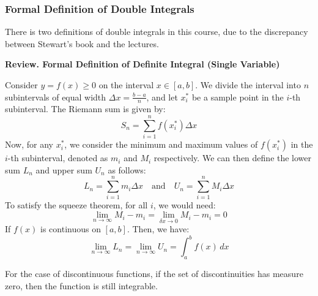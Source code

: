 \documentclass[11pt]{report}
\begin{document}
\subsubsection{Formal Definition of Double Integrals}
There is two definitions of double integrals in this course, due to the discrepancy between Stewart's book and the lectures. 

\begin{shaded}
    \textbf{Review.  Formal Definition of Definite Integral (Single Variable)}

    Consider $y = f(x) \ge 0$ on the interval $x \in [a,b]$. We divide the interval into $n$ subintervals of equal width $\Delta x = \frac{b-a}{n}$, and let $x_i^*$ be a sample point in the $i$-th subinterval. The Riemann sum is given by:
    $$
        S_n = \sum_{i=1}^n f(x_i^*) \Delta x
    $$
    Now, for any $x_i^*$, we consider the minimum and maximum values of $f(x_i^*)$ in the $i$-th subinterval, denoted as $m_i$ and $M_i$ respectively. We can then define the lower sum $L_n$ and upper sum $U_n$ as follows:
    $$
        L_n = \sum_{i=1}^n m_i \Delta x \quad \text{and} \quad U_n = \sum_{i=1}^n M_i \Delta x
    $$
    To satisfy the squeeze theorem, for all $i$, we would need:
    $$
        \lim_{n \to \infty} M_i - m_i = \lim_{\delta x \to 0} M_i - m_i = 0
    $$
    If $f(x)$ is continuous on $[a,b]$. Then, we have:
    $$
        \lim_{n \to \infty} L_n = \lim_{n \to \infty} U_n = \int_a^b f(x) \, dx
    $$

    For the case of discontinuous functions, if the set of discontinuities has measure zero, then the function is still integrable.
\end{shaded}
\end{document}
